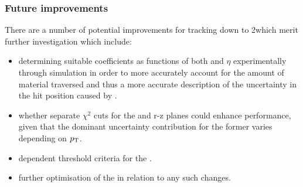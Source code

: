 \subsubsection{Future improvements}\label{subsubsec:2GeVoutlook}
There are a number of potential improvements for tracking down to 2\GeV which merit further investigation which include:
\begin{itemize}
\item determining suitable coefficients as functions of both \pT and $\eta$ experimentally through simulation in order to more accurately account for the amount of material traversed and thus a more accurate description of the uncertainty in the hit position caused by \MS.
\item whether separate \KF $\chi^{2}$ cuts for the \rphi and r-z planes could enhance performance, given that the dominant uncertainty contribution for the former varies depending on $p_{\mathrm{T}}$.
\item \pt dependent threshold criteria for the \HT.
\item further optimisation of the \KF in relation to any such changes.
\end{itemize}


